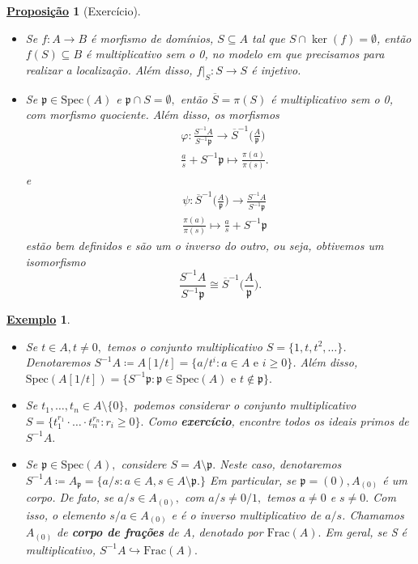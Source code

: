 \documentclass{article}
\newtheorem*{prop*}{\underline{Proposi\c c\~ao}}
\newtheorem{example}{\underline{Exemplo}}
\begin{document}
    \begin{prop*}[Exercício]
      \begin{itemize}
        \item[1)] Se \(f:A\rightarrow B\) é morfismo de domínios, \(S\subseteq A\) tal que \(S\cap\ker{(f)} = \emptyset\), então
          \(f(S)\subseteq B\) é multiplicativo sem o 0, no modelo em que precisamos para realizar a localização. Além disso, \(f|_S:S\rightarrow S\) 
          é injetivo.
        \item[2)] Se \(\mathfrak{p}\in \mathrm{Spec}(A)\) e \(\mathfrak{p}\cap S = \emptyset,\) então \(\overline{S} = \pi (S)\) é multiplicativo sem o 0, com
          morfismo quociente. Além disso, os morfismos
          \begin{align*}
  &\varphi :\frac{S^{-1}A}{S^{-1}\mathfrak{p}}\rightarrow \overline{S}^{-1}\biggl(\frac{A}{\mathfrak{p}}\biggr)\\
  &\frac{a}{s}+S^{-1}\mathfrak{p}\mapsto \frac{\pi (a)}{\pi (s)}.
          \end{align*}
          e 
          \begin{align*}
  &\psi:\overline{S}^{-1}\biggl(\frac{A}{\mathfrak{p}}\biggr)\rightarrow \frac{S^{-1}A}{S^{-1}\mathfrak{p}}\\
  &\frac{\pi (a)}{\pi (s)}\mapsto \frac{a}{s} + S^{-1}\mathfrak{p}
          \end{align*}
          estão bem definidos e são um o inverso do outro, ou seja, obtivemos um isomorfismo 
          \[
            \frac{S^{-1}A}{S^{-1}\mathfrak{p}}\cong{\overline{S}^{-1}\biggl(\frac{A}{\mathfrak{p}}\biggr)}.
          \]
      \end{itemize}  
    \end{prop*}
    \begin{example}
      \begin{itemize}
        \item[1)] Se \(t\in A, t\neq0,\) temos o conjunto multiplicativo \(S=\{1, t, t^{2}, \dotsc\}\).
          Denotaremos \(S^{-1}A\coloneqq A[1/t] = \{a/t^{i}: a\in A \text{ e } i\geq 0\}\). Além disso, 
          \(\mathrm{Spec}(A[1/t]) = \{S^{-1}\mathfrak{p}:\mathfrak{p}\in \mathrm{Spec}(A) \text{ e }t\not\in \mathfrak{p}\}.\)
        \item[2)] Se \(t_{1}, \dotsc, t_{n}\in A\setminus{\{0\}},\) podemos considerar o conjunto multiplicativo \(S = \{t_{1}^{r_{1}}\cdot \dotsc \cdot t_{n}^{r_{n}}: r_{i}\geq 0\}.\)
          Como \textbf{exercício}, encontre todos os ideais primos de \(S^{-1}A.\)
        \item[3)] Se \(\mathfrak{p}\in \mathrm{Spec}(A),\) considere \(S = A\setminus{\mathfrak{p}}.\) Neste caso, denotaremos 
          \(S^{-1}A\coloneqq A_{\mathfrak{p}} = \{a/s: a\in A, s\in A\setminus{\mathfrak{p}}.\}\) Em particular, se \(\mathfrak{p}=(0), A_{(0)}\)
          é um corpo. De fato, se \(a/s\in A_{(0)},\) com \(a/s\neq0/1,\) temos \(a\neq0\) e \(s\neq0.\) Com isso, o elemento
          \(s/a\in A_{(0)}\) e é o inverso multiplicativo de \(a/s\). Chamamos \(A_{(0)}\) de \textbf{corpo de frações} de A,
          denotado por \(\mathrm{Frac}(A).\) Em geral, se S é multiplicativo, \(S^{-1}A\hookrightarrow \mathrm{Frac}(A).\)
      \end{itemize}
    \end{example}
\end{document}
